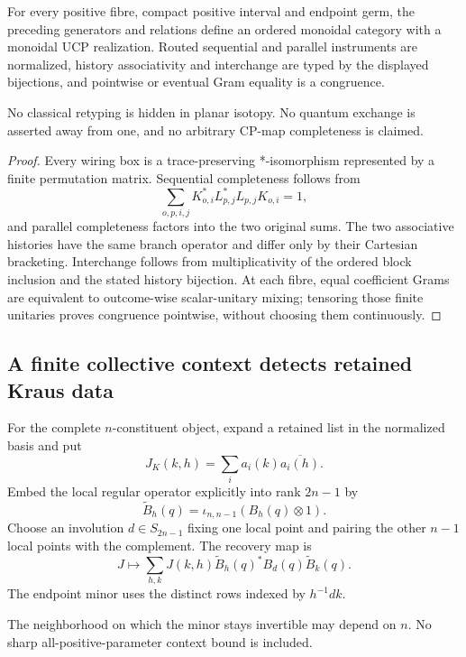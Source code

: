 \begin{theorem}
{\normalfont\statusProved}\quad
For every positive fibre, compact positive interval and endpoint germ, the
preceding generators and relations define an ordered monoidal category with
a monoidal UCP realization.  Routed sequential and parallel instruments are
normalized, history associativity and interchange are typed by the displayed
bijections, and pointwise or eventual Gram equality is a congruence.
\end{theorem}
\begin{scope}
No classical retyping is hidden in planar isotopy.  No quantum exchange is
asserted away from one, and no arbitrary CP-map completeness is claimed.
\end{scope}
\begin{proof}
Every wiring box is a trace-preserving *-isomorphism represented by a finite
permutation matrix.  Sequential completeness follows from
\[
 \sum_{o,p,i,j}K_{o,i}^*L_{p,j}^*L_{p,j}K_{o,i}=1,
\]
and parallel completeness factors into the two original sums.  The two
associative histories have the same branch operator and differ only by their
Cartesian bracketing.  Interchange follows from multiplicativity of the
ordered block inclusion and the stated history bijection.  At each fibre,
equal coefficient Grams are equivalent to outcome-wise scalar-unitary
mixing; tensoring those finite unitaries proves congruence pointwise, without
choosing them continuously.
\end{proof}

\subsection{A finite collective context detects retained Kraus data}

\begin{definition}
For the complete $n$-constituent object, expand a retained list in the
normalized basis and put
\[
 J_K(k,h)=\sum_i a_i(k)\overline{a_i(h)}.
\]
Embed the local regular operator explicitly into rank $2n-1$ by
\[
 \widetilde B_h(q)=\iota_{n,n-1}(B_h(q)\otimes1).
\]
Choose an involution $d\in S_{2n-1}$ fixing one local point and pairing the
other $n-1$ local points with the complement.  The recovery map is
\[
 J\longmapsto\sum_{h,k}J(k,h)
       \widetilde B_h(q)^*B_d(q)\widetilde B_k(q).
\]
The endpoint minor uses the distinct rows indexed by $h^{-1}dk$.
\end{definition}
\begin{scope}
The neighborhood on which the minor stays invertible may depend on $n$.
No sharp all-positive-parameter context bound is included.
\end{scope}

